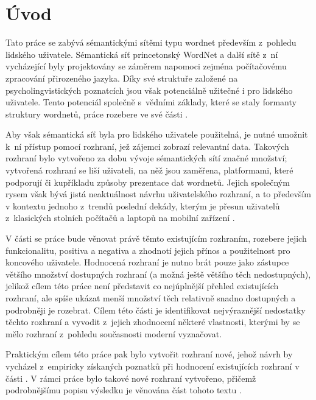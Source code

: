 \documentclass[a4paper, 11pt, oneside, showtrims]{book}
\newcommand{\itNameRef}[1]{\textit{\nameref{#1}}}
\begin{document}
	\newpage

	\chapter*{Úvod}\label{uvod}


		Tato práce se zabývá sémantickými sítěmi typu wordnet především z~pohledu lidského uživatele. Sémantická síť princetonský WordNet a další sítě z~ní vycházející byly projektovány se záměrem napomoci zejména počítačovému zpracování přirozeného jazyka. Díky své struktuře založené na psycholingvistických poznatcích jsou však potenciálně užitečné i pro lidského uživatele. Tento potenciál společně s~vědními základy, které se staly formanty struktury wordnetů, práce rozebere ve své části \itNameRef{part:eins}.

		Aby však sémantická síť byla pro lidského uživatele použitelná, je nutné umožnit k~ní přístup pomocí rozhraní, jež zájemci zobrazí relevantní data. Takových rozhraní bylo vytvořeno za dobu vývoje sémantických sítí značné množství; vytvořená rozhraní se liší uživateli, na něž jsou zaměřena, platformami, které podporují či kupříkladu způsoby prezentace dat wordnetů. Jejich společným rysem však bývá jistá neaktuálnost návrhu uživatelského rozhraní, a to především v kontextu jednoho z~trendů poslední dekády, kterým je přesun uživatelů z~klasických stolních počítačů a laptopů na mobilní zařízení  \parencite{grace2013mobile}.

		V části \itNameRef{part:zwei} se práce bude věnovat právě těmto existujícím rozhraním, rozebere jejich funkcionalitu, positiva a negativa a zhodnotí jejich přínos a použitelnost pro koncového uživatele. Hodnocená rozhraní je nutno brát pouze jako zástupce většího množství dostupných rozhraní (a možná ještě většího těch nedostupných), jelikož cílem této práce není představit co nejúplnější přehled existujících rozhraní, ale spíše ukázat menší množství těch relativně snadno dostupných a podrobněji je rozebrat. Cílem této části je identifikovat nejvýraznější nedostatky těchto rozhraní a vyvodit z~jejich zhodnocení některé vlastnosti, kterými by se mělo rozhraní z~pohledu současnosti moderní vyznačovat. 

		Praktickým cílem této práce pak bylo vytvořit rozhraní nové, jehož návrh by vycházel z~empiricky získaných poznatků při hodnocení existujících rozhraní v části \itNameRef{part:zwei}. V rámci práce bylo takové nové rozhraní vytvořeno, přičemž podrobnějšímu popisu výsledku je věnována část tohoto textu \itNameRef{part:drei}.
\end{document}
